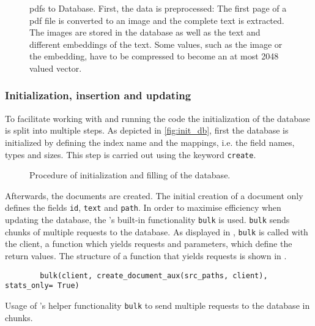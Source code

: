 \begin{figure}[htp] %
    \centering
    
    \caption[Database procedure]{\acp{pdf} to Database. 
    First, the data is preprocessed:
    The first page of a \ac{pdf} file is converted to an image and the complete text is extracted. 
    The images are stored in the database as well as the text and different embeddings of the text.
    Some values, such as the image or the \infersent{} embedding, have to be compressed to become an at most 2048 valued vector.
    }
    \label{fig:pdf2db}
\end{figure}

\subsubsection*{Initialization, insertion and updating}
To facilitate working with and running the code the initialization of the database is split into multiple steps.
As depicted in \autoref{fig:init_db}, first the database is initialized by defining the index name and the mappings, i.e. the field names, types and sizes.
This step is carried out using the keyword \texttt{create}.

\begin{figure}[htp] %
    \centering
    
    \caption[Initialization and filling of the database]{Procedure of initialization and filling of the database.}
    \label{fig:init_db}
\end{figure}

Afterwards, the documents are created.
The initial creation of a document only defines the fields \texttt{id}, \texttt{text} and \texttt{path}.
In order to maximise efficiency when updating the database, the \databaseName{}'s built-in functionality \texttt{bulk} is used.
\texttt{bulk} sends chunks of multiple requests to the database.
As displayed in , \texttt{bulk} is called with the \databaseName{} client, 
a function which yields requests and parameters, which define the return values.
The structure of a function that yields requests is shown in .

\begin{listing}[htp]
    \begin{verbatim}
        bulk(client, create_document_aux(src_paths, client), stats_only= True)
    \end{verbatim}
    \caption[Usage of \databaseName{}'s helper functionality \texttt{bulk}]
    {Usage of \databaseName{}'s helper functionality \texttt{bulk} to send multiple requests to the database in chunks.
    }
    \label{lst:db_bulk}
\end{listing}

